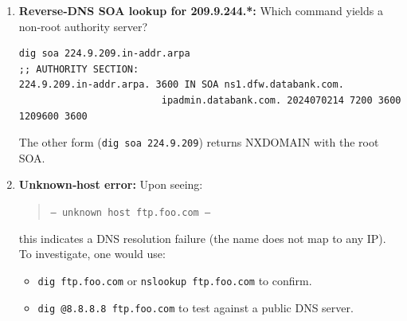 \documentclass[12pt]{article}
\begin{document}
\begin{enumerate}
\begin{enumerate}
\begin{lstlisting}[caption={Output of \texttt{dig soa www.cs.csub.edu}}]
;; ANSWER SECTION:
www.cs.csub.edu. 86400 IN CNAME odin.cs.csub.edu.

;; AUTHORITY SECTION:
cs.csub.edu.     43200 IN SOA sleipnir.cs.csubak.edu. postmaster.cs.csubak.edu.
                2024120200 300 60 1209600 43200

;; Query time: 0 msec
;; SERVER: 136.168.x.x#53
;; WHEN: Thu Jun 12 08:08:11 PDT 2025
  \end{lstlisting}

  \textbf{Difference:}  
  The plain A‐record lookup returns the alias (CNAME) and its IPv4 address. The SOA query returns, in the AUTHORITY section, the zone’s Start‐Of‐Authority record (primary name server, administrator, serial, timers), rather than the address itself.

  \end{enumerate}

\item \textbf{Reverse‐DNS SOA lookup for 209.9.244.*:}  
Which command yields a non‐root authority server?  
\begin{lstlisting}[caption={Correct SOA lookup for the reverse zone}]
dig soa 224.9.209.in-addr.arpa
;; AUTHORITY SECTION:
224.9.209.in-addr.arpa. 3600 IN SOA ns1.dfw.databank.com.
                         ipadmin.databank.com. 2024070214 7200 3600 1209600 3600
\end{lstlisting}
The other form (\texttt{dig soa 224.9.209}) returns NXDOMAIN with the root SOA.

\item \textbf{Unknown‐host error:}  
Upon seeing:
\begin{quote}
\texttt{--- unknown host ftp.foo.com ---}
\end{quote}
this indicates a DNS resolution failure (the name does not map to any IP). To investigate, one would use:
\begin{itemize}
  \item \texttt{dig ftp.foo.com} or \texttt{nslookup ftp.foo.com} to confirm.
  \item \texttt{dig @8.8.8.8 ftp.foo.com} to test against a public DNS server.
\end{itemize}


\end{enumerate}
\end{document}
